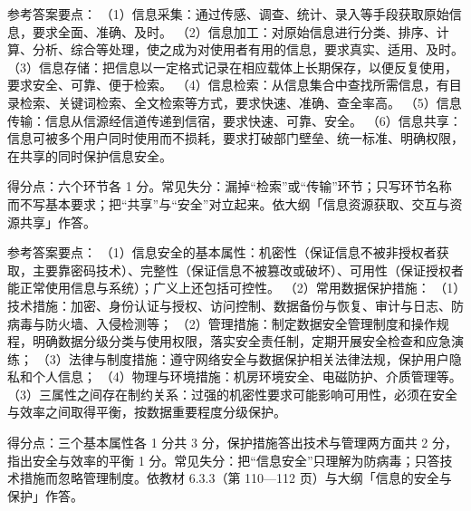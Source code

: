 \documentclass[a4paper,11pt]{article}
\begin{document}
\q 参考答案要点：
（1）信息采集：通过传感、调查、统计、录入等手段获取原始信息，要求全面、准确、及时。
（2）信息加工：对原始信息进行分类、排序、计算、分析、综合等处理，使之成为对使用者有用的信息，要求真实、适用、及时。
（3）信息存储：把信息以一定格式记录在相应载体上长期保存，以便反复使用，要求安全、可靠、便于检索。
（4）信息检索：从信息集合中查找所需信息，有目录检索、关键词检索、全文检索等方式，要求快速、准确、查全率高。
（5）信息传输：信息从信源经信道传递到信宿，要求快速、可靠、安全。
（6）信息共享：信息可被多个用户同时使用而不损耗，要求打破部门壁垒、统一标准、明确权限，在共享的同时保护信息安全。
\begin{analysis}得分点：六个环节各 1 分。常见失分：漏掉“检索”或“传输”环节；只写环节名称而不写基本要求；把“共享”与“安全”对立起来。依大纲「信息资源获取、交互与资源共享」作答。\end{analysis}

\q 参考答案要点：
（1）信息安全的基本属性：机密性（保证信息不被非授权者获取，主要靠密码技术）、完整性（保证信息不被篡改或破坏）、可用性（保证授权者能正常使用信息与系统）；广义上还包括可控性。
（2）常用数据保护措施：
（1）技术措施：加密、身份认证与授权、访问控制、数据备份与恢复、审计与日志、防病毒与防火墙、入侵检测等；
（2）管理措施：制定数据安全管理制度和操作规程，明确数据分级分类与使用权限，落实安全责任制，定期开展安全检查和应急演练；
（3）法律与制度措施：遵守网络安全与数据保护相关法律法规，保护用户隐私和个人信息；
（4）物理与环境措施：机房环境安全、电磁防护、介质管理等。
（3）三属性之间存在制约关系：过强的机密性要求可能影响可用性，必须在安全与效率之间取得平衡，按数据重要程度分级保护。
\begin{analysis}得分点：三个基本属性各 1 分共 3 分，保护措施答出技术与管理两方面共 2 分，指出安全与效率的平衡 1 分。常见失分：把“信息安全”只理解为防病毒；只答技术措施而忽略管理制度。依教材 6.3.3（第 110—112 页）与大纲「信息的安全与保护」作答。\end{analysis}

\end{document}
